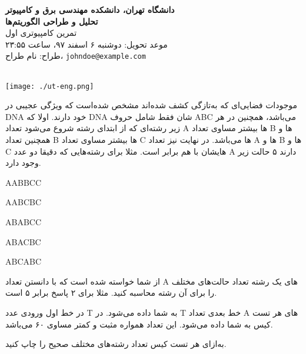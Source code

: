 \documentclass[11.5pt,a4paper,oneside]{article}
\makeatletter
\renewcommand{\contestname}{
دانشگاه تهران، دانشکده مهندسی برق و کامپیوتر \\
تحلیل و طراحی الگوریتم‌ها \\
}
\renewcommand{\contestauthor}{
تمرین کامپیوتری اول \\ موعد تحویل: دوشنبه ۶ اسفند ۹۷، ساعت ۲۳:۵۵ \\ طراح:‌ نام طراح،
\texttt{johndoe@example.com}
}
\makeatother
\begin{document}
{\noindent \Large \bf \contestname}
{\contestauthor}

\begin{flushleft}
\nothing\\[-3.2cm]
\texttt{[image: ./ut-eng.png]}
\end{flushleft}

\def\problemCode{DNA}
\def\problemEnglishTitle{Foreign DNA}
\def\problemFarsiTitle{دی‌ان‌ای فضایی}
\def\timeLimit{$2$ \second}
\def\memLimit{$256$ \megabytes}
\begin{problem}
موجودات فضایی‌ای که به‌تازگی کشف شده‌اند مشخص شده‌است که ویژگی عجیبی در DNA خود دارند. اولا که DNA شان فقط شامل حروف ABC می‌باشد، همچنین در هر زیر رشته‌ای که از ابتدای رشته شروع می‌شود تعداد A ها بیشتر مساوی تعداد B ها و همچنین تعداد B ها بیشتر مساوی تعداد C ها می‌باشد. در نهایت نیز تعداد A ها و B ها و C هایشان با هم برابر است. مثلا برای رشته‌هایی که دقیقا دو عدد A دارند ۵ حالت زیر وجود دارد.
\begin{shortitems}
\item
AABBCC
\item
AABCBC
\item
ABABCC
\item
ABACBC
\item
ABCABC
\end{shortitems}
از شما خواسته شده است که با دانستن تعداد A های یک رشته تعداد حالت‌های مختلف را برای آن رشته محاسبه کنید. مثلا برای ۲ پاسخ برابر ۵ است.

در خط اول ورودی عدد T به شما داده می‌شود. در T خط بعدی تعداد A های هر تست کیس به شما داده می‌شود. این تعداد همواره مثبت و کمتر مساوی ۶۰ می‌باشد.

\outputDescription
به‌ازای هر تست کیس تعداد رشته‌های مختلف صحیح را چاپ کنید.

\sampleIO

\begin{example}
%
\end{example}


\end{problem}
\end{document}
